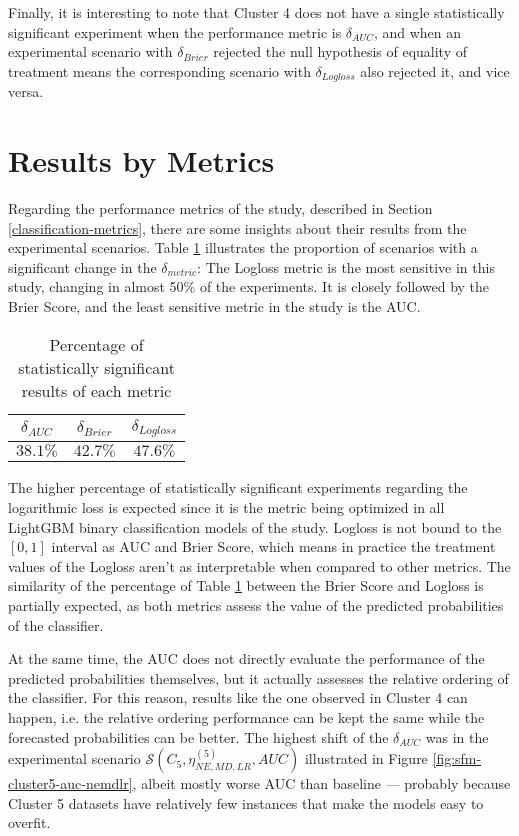 Finally, it is interesting to note that Cluster 4 does not have a single statistically significant experiment when the performance metric is $\delta_{AUC}$, and when an experimental scenario with $\delta_{Brier}$ rejected the null hypothesis of equality of treatment means the corresponding scenario with $\delta_{Logloss}$ also rejected it, and vice versa.

\section{Results by Metrics}

Regarding the performance metrics of the study, described in  Section \ref{classification-metrics}, there are some insights about their results from the experimental scenarios. Table \ref{table:stats-metrics} illustrates the proportion of scenarios with a significant change in the $\delta_{metric}$: The Logloss metric is the most sensitive in this study, changing in almost 50\% of the experiments. It is closely followed by the Brier Score, and the least sensitive metric in the study is the AUC.

\begin{table}[H]
    \centering
    \begin{tabular}{ccc}
              \textbf{$\delta_{AUC}$} & \textbf{$\delta_{Brier}$} & \textbf{$\delta_{Logloss}$} \\
              \midrule
              $38.1\%$&$42.7\%$&$47.6\%$
    \end{tabular}
    \caption{Percentage of statistically significant results of each metric}
    \label{table:stats-metrics}
\end{table}

The higher percentage of statistically significant experiments regarding the logarithmic loss is expected since it is the metric being optimized in all LightGBM binary classification models of the study. Logloss is not bound to the $\left[0, 1\right]$ interval as AUC and Brier Score, which means in practice the treatment values of the Logloss aren't as interpretable when compared to other metrics. The similarity of the percentage of Table \ref{table:stats-metrics} between the Brier Score and Logloss is partially expected, as both metrics assess the value of the predicted probabilities of the classifier.

At the same time, the AUC does not directly evaluate the performance of the predicted probabilities themselves, but it actually assesses the relative ordering of the classifier. For this reason, results like the one observed in Cluster 4 can happen, i.e. the relative ordering performance can be kept the same while the forecasted probabilities can be better. The highest shift of the $\delta_{AUC}$ was in the experimental scenario $\mathcal{S}(C_5, \eta^{(5)}_{NE, MD, LR}, AUC)$ illustrated in Figure \ref{fig:sfm-cluster5-auc-nemdlr}, albeit mostly worse AUC than baseline --- probably because Cluster 5 datasets have relatively few instances that make the models easy to overfit.

